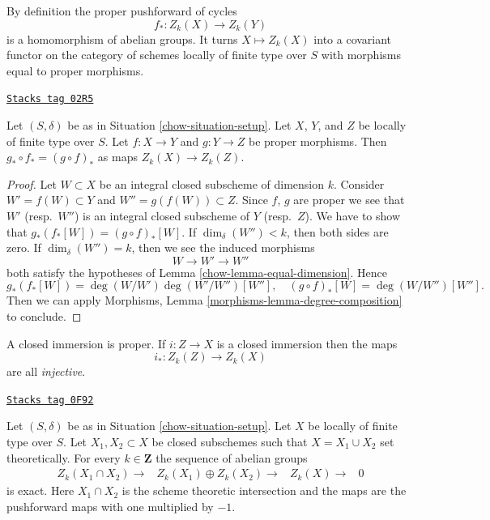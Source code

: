 By definition the proper pushforward of cycles
$$
f_* : Z_k(X) \longrightarrow Z_k(Y)
$$
is a homomorphism of abelian groups. It turns $X \mapsto Z_k(X)$
into a covariant functor on the category of schemes locally of
finite type over $S$ with morphisms equal to proper morphisms.

\begin{lemma}
\label{chow-lemma-compose-pushforward}
\href{https://stacks.math.columbia.edu/tag/02R5}{\texttt{Stacks tag 02R5}}

Let $(S, \delta)$ be as in Situation \ref{chow-situation-setup}.
Let $X$, $Y$, and $Z$ be locally of finite type over $S$.
Let $f : X \to Y$ and $g : Y \to Z$ be proper morphisms.
Then $g_* \circ f_* = (g \circ f)_*$ as maps $Z_k(X) \to Z_k(Z)$.
\end{lemma}

\begin{proof}

Let $W \subset X$ be an integral closed subscheme of dimension $k$.
Consider $W' = f(W) \subset Y$ and $W'' = g(f(W)) \subset Z$.
Since $f$, $g$ are proper we see that $W'$ (resp.\ $W''$) is
an integral closed subscheme of $Y$ (resp.\ $Z$).
We have to show that $g_*(f_*[W]) = (g \circ f)_*[W]$.
If $\dim_\delta(W'') < k$, then both sides are zero.
If $\dim_\delta(W'') = k$, then we see the induced morphisms
$$
W \longrightarrow
W' \longrightarrow
W''
$$
both satisfy the hypotheses of Lemma \ref{chow-lemma-equal-dimension}. Hence
$$
g_*(f_*[W]) = \deg(W/W')\deg(W'/W'')[W''],
\quad
(g \circ f)_*[W] = \deg(W/W'')[W''].
$$
Then we can apply
Morphisms, Lemma \ref{morphisms-lemma-degree-composition}
to conclude.
\end{proof}

A closed immersion is proper. If $i : Z \to X$ is a closed immersion
then the maps
$$
i_* : Z_k(Z) \longrightarrow Z_k(X)
$$
are all {\it injective}.

\begin{lemma}
\label{chow-lemma-exact-sequence-closed}
\href{https://stacks.math.columbia.edu/tag/0F92}{\texttt{Stacks tag 0F92}}

Let $(S, \delta)$ be as in Situation \ref{chow-situation-setup}.
Let $X$ be locally of finite type over $S$. Let $X_1, X_2 \subset X$
be closed subschemes such that $X = X_1 \cup X_2$ set theoretically.
For every $k \in \mathbf{Z}$ the sequence of abelian groups
$$
\begin{array}{cccc}Z_k(X_1 \cap X_2) \longrightarrow & Z_k(X_1) \oplus Z_k(X_2) \longrightarrow & Z_k(X) \longrightarrow & 0\end{array}
$$
is exact. Here $X_1 \cap X_2$ is the scheme theoretic intersection and
the maps are the pushforward maps with one multiplied by $-1$.
\end{lemma}

